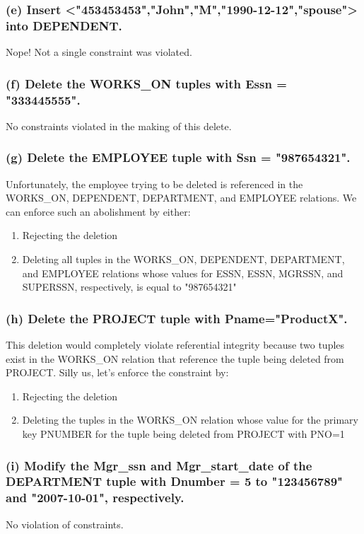 \subsubsection*{(e) Insert <"453453453","John","M","1990-12-12","spouse"> into DEPENDENT.}
Nope! Not a single constraint was violated.

\subsubsection*{(f) Delete the WORKS\_ON tuples with Essn = "333445555".}
No constraints violated in the making of this delete.

\subsubsection*{(g) Delete the EMPLOYEE tuple with Ssn = "987654321".}
Unfortunately, the employee trying to be deleted is referenced in the WORKS\_ON, DEPENDENT, DEPARTMENT, and EMPLOYEE relations. We can enforce such an abolishment by either:
\begin{enumerate}
\item Rejecting the deletion
\item Deleting all tuples in the WORKS\_ON, DEPENDENT, DEPARTMENT, and EMPLOYEE relations whose values for ESSN, ESSN, MGRSSN, and SUPERSSN, respectively, is equal to "987654321"
\end{enumerate}

\subsubsection*{(h) Delete the PROJECT tuple with Pname="ProductX".}
This deletion would completely violate referential integrity because two tuples exist in the WORKS\_ON relation that reference the tuple being deleted from PROJECT. Silly us,  let's enforce the constraint by:
\begin{enumerate} 
\item Rejecting the deletion
\item Deleting the tuples in the WORKS\_ON relation whose value for the primary key PNUMBER for the tuple being deleted from PROJECT with PNO=1
\end{enumerate}

\subsubsection*{(i) Modify the Mgr\_ssn and Mgr\_start\_date of the DEPARTMENT tuple with Dnumber = 5 to "123456789" and "2007-10-01", respectively.}
No violation of constraints.

